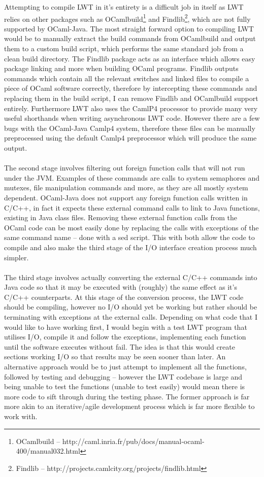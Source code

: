 \documentclass[12pt,twoside,notitlepage]{report}
\begin{document}
Attempting to compile LWT in it's entirety is a difficult job in itself as LWT relies on other packages such as OCamlbuild\footnote{OCamlbuild -- http://caml.inria.fr/pub/docs/manual-ocaml-400/manual032.html} and
Findlib\footnote{Findlib -- http://projects.camlcity.org/projects/findlib.html}, which are not fully supported by OCaml-Java. The most straight forward option to compiling LWT would be to manually extract the build
commands from OCamlbuild and output them to a custom build script, which performs the same standard job from a clean build directory. The Findlib package acts as an interface which allows easy package linking and more when building
OCaml programs. Findlib outputs commands which contain all the relevant switches and linked files to compile a piece of OCaml software correctly, therefore by intercepting these commands and replacing them in the build script, I
can remove Findlib and OCamlbuild support entirely. Furthermore LWT also uses the CamlP4 processor to provide many very useful shorthands when writing asynchronous LWT code. However there are a few bugs with the OCaml-Java Camlp4
system, therefore these files can be manually preprocessed using the default Camlp4 preprocessor which will produce the same output.
\hfill\\
\hfill\\
The second stage involves filtering out foreign function calls that will not run under the JVM. Examples of these commands are calls to system semaphores and mutexes, file manipulation commands and more, as they are all mostly system
dependent. OCaml-Java does not support any foreign function calls written in C/C++, in fact it expects these external command calls to link to Java functions, existing in Java class files. Removing these external function calls from the
OCaml code can be most easily done by replacing the calls with exceptions of the same command name -- done with a sed script. This with both allow the code to compile and also make the third stage of the I/O interface creation process
much simpler.
\hfill\\
\hfill\\
The third stage involves actually converting the external C/C++ commands into Java code so that it may be executed with (roughly) the same effect as it's C/C++ counterparts. At this stage of the conversion process, the LWT code
should be compiling, however no I/O should yet be working but rather should be terminating with exceptions at the external calls. Depending on what code that I would like to have working first, I would begin with a test LWT program that
utilises I/O, compile it and follow the exceptions, implementing each function until the software executes without fail. The idea is that this would create sections working I/O so that results may be seen sooner than later. An alternative
approach would be to just attempt to implement all the functions, followed by testing and debugging -- however the LWT codebase is large and being unable to test the functions (unable to test easily) would mean there is more code to
sift through during the testing phase. The former approach is far more akin to an iterative/agile development process which is far more flexible to work with.
\end{document}
